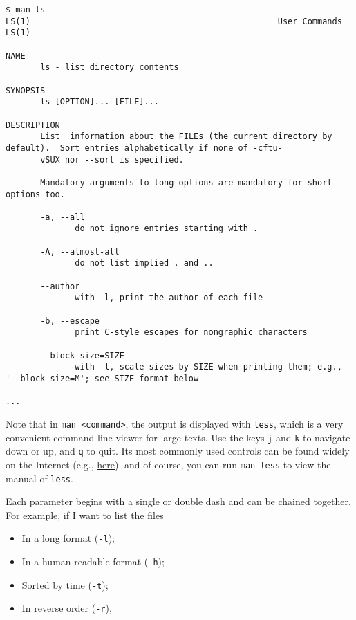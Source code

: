 \documentclass[12pt,letterpaper]{article}
\begin{document}
\begin{verbatim}
$ man ls
LS(1)                                                  User Commands                                                  LS(1)

NAME
       ls - list directory contents

SYNOPSIS
       ls [OPTION]... [FILE]...

DESCRIPTION
       List  information about the FILEs (the current directory by default).  Sort entries alphabetically if none of -cftu‐
       vSUX nor --sort is specified.

       Mandatory arguments to long options are mandatory for short options too.

       -a, --all
              do not ignore entries starting with .

       -A, --almost-all
              do not list implied . and ..

       --author
              with -l, print the author of each file

       -b, --escape
              print C-style escapes for nongraphic characters

       --block-size=SIZE
              with -l, scale sizes by SIZE when printing them; e.g., '--block-size=M'; see SIZE format below

...
\end{verbatim}

Note that in \texttt{man <command>}, the output is displayed with \texttt{less}, which is a very convenient command-line viewer for large texts. Use the keys \texttt{j} and \texttt{k} to navigate down or up, and \texttt{q} to quit. Its most commonly used controls can be found widely on the Internet (e.g., \href{https://linuxize.com/post/less-command-in-linux/#less-commands}{here}). and of course, you can run \texttt{man less} to view the manual of \texttt{less}.

Each parameter begins with a single or double dash and can be chained together. For example, if I want to list the files

\begin{itemize}
   \item In a long format (\texttt{-l});
   \item In a human-readable format (\texttt{-h});
   \item Sorted by time (\texttt{-t});
   \item In reverse order (\texttt{-r}),
\end{itemize}
\end{document}
